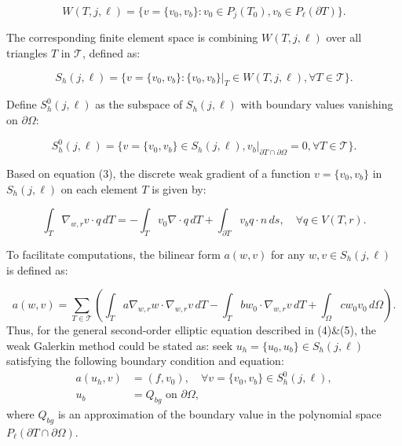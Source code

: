 \documentclass[12pt]{article} %
\begin{document}
\begin{equation}
    W(T, j, \ell) = \{v = \{v_0, v_b\} : v_0 \in P_j(T_0), v_b \in P_\ell(\partial T)\}.
\end{equation}

The corresponding finite element space is combining \(W(T, j, \ell)\) over all triangles \(T\) in \(\mathcal{T}\), defined as:

\begin{equation}
    S_h(j, \ell) = \{v = \{v_0, v_b\} : \{v_0, v_b\}|_T \in W(T, j, \ell), \forall T \in \mathcal{T}\}.
\end{equation}

Define \(S^0_h(j, \ell)\) as the subspace of \(S_h(j, \ell)\) with boundary values vanishing on \(\partial\Omega\):

\begin{equation}
    S^0_h(j, \ell) = \{v = \{v_0, v_b\} \in S_h(j, \ell), v_b|_{\partial T \cap \partial \Omega} = 0, \forall T \in \mathcal{T}\}.
\end{equation}

Based on equation (3), the discrete weak gradient of a function \(v = \{v_0, v_b\}\) in \(S_h(j, \ell)\) on each element \(T\) is given by:

\begin{equation}
    \int_T \nabla_{w,r}v \cdot q \, dT = -\int_T v_0 \nabla \cdot q \, dT + \int_{\partial T} v_b q \cdot n \, ds, \quad \forall q \in V(T, r).
\end{equation}

To facilitate computations, the bilinear form \(a(w, v)\) for any \(w, v \in S_h(j, \ell)\) is defined as:

\begin{equation}
    a(w, v) = \sum_{T \in \mathcal{T}} \left( \int_T a \nabla_{w,r} w \cdot \nabla_{w,r} v \, dT - \int_T b w_0 \cdot \nabla_{w,r} v \, dT + \int_\Omega c w_0 v_0 \, d\Omega \right).
\end{equation} 
Thus, for the general second-order elliptic equation described in (4)\&(5), the weak Galerkin method could be stated as:
seek \( u_h = \{u_0, u_b\} \in S_h(j, \ell) \) satisfying the following boundary condition and equation:
\begin{align}
    a(u_h, v) &= (f, v_0), \quad \forall v = \{v_0, v_b\} \in S^0_h(j, \ell), \\
    u_b &= Q_{bg} \text{ on } \partial \Omega,
\end{align}
where \( Q_{bg} \) is an approximation of the boundary value in the polynomial space \( P_{\ell}(\partial T \cap \partial \Omega) \). 
\end{document}
